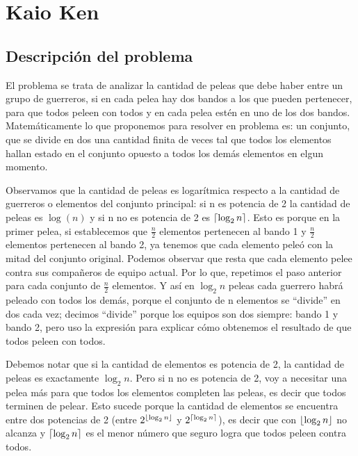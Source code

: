 \documentclass[10pt,a4paper]{article}
\DeclarePairedDelimiter\ceil{\lceil}{\rceil}
\DeclarePairedDelimiter\floor{\lfloor}{\rfloor}
\begin{document}

\section{Kaio Ken}

\subsection{Descripción del problema}
\par{El problema se trata de analizar la cantidad de peleas que debe haber entre un grupo de
guerreros, si en cada pelea hay dos bandos a los que pueden pertenecer, para que todos
peleen con todos y en cada pelea estén en uno de los dos bandos. Matemáticamente lo que
proponemos para resolver en problema es: un conjunto, que se divide en dos una cantidad
finita de veces tal que todos los elementos hallan estado en el conjunto opuesto a todos
los demás elementos en elgun momento.}
\par{Observamos que la cantidad de peleas es logarítmica respecto a la cantidad de guerreros o elementos del conjunto principal: si n es potencia de 2 la cantidad de peleas es $\log(n)$ y si n no es potencia de 2 es $\ceil*{\log_2 n}$. Esto es porque en la primer pelea, si establecemos que $\frac{n}{2}$ elementos pertenecen al bando 1 y $\frac{n}{2}$ elementos pertenecen al bando 2, ya tenemos que cada elemento peleó con la mitad del conjunto original. Podemos observar que resta que cada elemento pelee contra sus compañeros de equipo actual. Por lo que, repetimos el paso anterior para cada conjunto de $\frac{n}{2}$ elementos. Y así en $\log_2 n$ peleas cada guerrero habrá peleado con todos los demás, porque el conjunto de n elementos se “divide” en dos cada vez; decimos “divide” porque los equipos son dos siempre: bando 1 y bando 2, pero uso la expresión para explicar cómo obtenemos el resultado de que todos peleen con todos.}
\par{Debemos notar que si la cantidad de elementos es potencia de 2, la cantidad de peleas es exactamente $\log_2 n$. Pero si n no es potencia de 2, voy a necesitar una pelea más para que todos los elementos completen las peleas, es decir que todos terminen de pelear. Esto sucede porque la cantidad de elementos se encuentra entre dos
potencias de 2 (entre $2^{\floor*{\log_2 n}}$ y $2^{\ceil*{\log_2 n}}$), es decir que con ${\floor*{\log_2 n}}$ no alcanza y ${\ceil*{\log_2 n}}$ es el menor número que seguro logra que todos peleen contra todos.}
\end{document}
